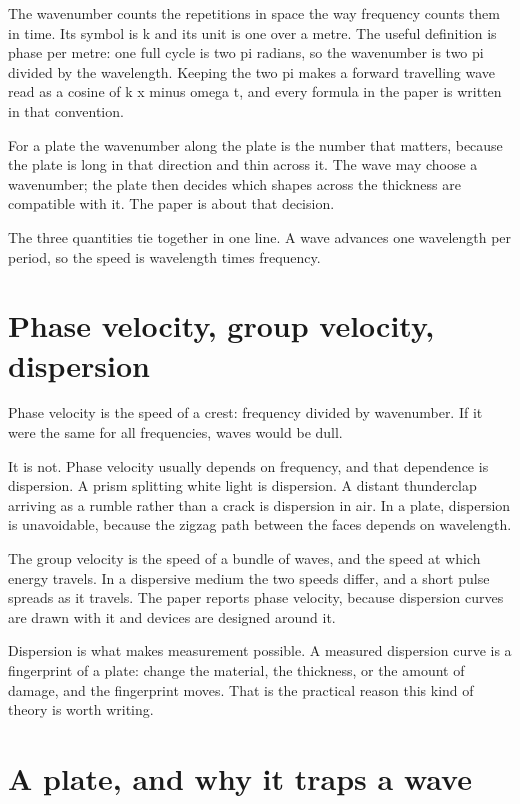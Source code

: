 \documentclass[11pt]{article}
\begin{document}
The wavenumber counts the repetitions in space the way frequency counts them in time. Its symbol is k and its
unit is one over a metre. The useful definition is phase per metre: one full cycle is two pi radians, so the
wavenumber is two pi divided by the wavelength. Keeping the two pi makes a forward travelling wave read as a
cosine of k x minus omega t, and every formula in the paper is written in that convention.

For a plate the wavenumber along the plate is the number that matters, because the plate is long in that
direction and thin across it. The wave may choose a wavenumber; the plate then decides which shapes across
the thickness are compatible with it. The paper is about that decision.

The three quantities tie together in one line. A wave advances one wavelength per period, so the speed is
wavelength times frequency.

\section{Phase velocity, group velocity, dispersion}

Phase velocity is the speed of a crest: frequency divided by wavenumber. If it were the same for all
frequencies, waves would be dull.

It is not. Phase velocity usually depends on frequency, and that dependence is dispersion. A prism splitting
white light is dispersion. A distant thunderclap arriving as a rumble rather than a crack is dispersion in
air. In a plate, dispersion is unavoidable, because the zigzag path between the faces depends on wavelength.

The group velocity is the speed of a bundle of waves, and the speed at which energy travels. In a dispersive
medium the two speeds differ, and a short pulse spreads as it travels. The paper reports phase velocity,
because dispersion curves are drawn with it and devices are designed around it.

Dispersion is what makes measurement possible. A measured dispersion curve is a fingerprint of a plate: change
the material, the thickness, or the amount of damage, and the fingerprint moves. That is the practical reason
this kind of theory is worth writing.

\section{A plate, and why it traps a wave}
\end{document}
